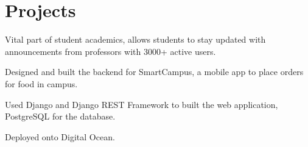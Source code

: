 \documentclass[]{resume}
\begin{document}
\begin{minipage}[t]{0.70\textwidth}
\section{Projects}
\begin{tightemize}
\item Vital part of student academics, allows students to stay updated with announcements from
professors with 3000+ active users.
\end{tightemize}
\subsectionsep

\begin{tightemize}
 \item Designed and built the backend for SmartCampus, a mobile app to place orders for food in campus.
 \item Used Django and Django REST Framework to built the web application, PostgreSQL for the database.
 \item Deployed onto Digital Ocean.
\end{tightemize}
\primarysectionsep  %


 \end{minipage}
 
\end{document}
